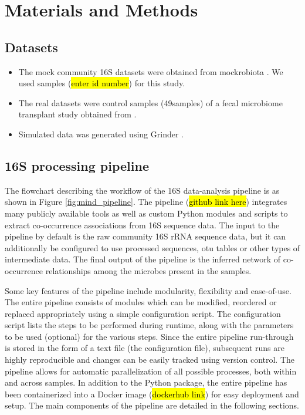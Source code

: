 
\section*{Materials and Methods}

  \subsection*{Datasets}

    \vspace{-5mm}
    \begin{itemize}
      \item The mock community 16S datasets were obtained from mockrobiota \cite{Bokulich2016}. We used samples (\hl{enter id number}) for this study.
      \item The real datasets were control samples (49samples)  of a fecal microbiome transplant study obtained from \cite{Kang2017}.
      \item Simulated data was generated using Grinder \cite{Angly2012}.
    \end{itemize}


  \subsection*{16S processing pipeline}

    \vspace{-5mm}

    The flowchart describing the workflow of the 16S data-analysis pipeline is as shown in Figure \ref{fig:mind_pipeline}.
    The pipeline (\hl{github link here}) integrates many publicly available tools as well as custom Python modules and scripts to extract co-occurrence associations from 16S sequence data.
    The input to the pipeline by default is the raw community 16S rRNA sequence data, but it can additionally be configured to use processed sequences, \ac{otu} tables or other types of intermediate data.
    The final output of the pipeline is the inferred network of co-occurrence relationships among the microbes present in the samples.

    Some key features of the pipeline include modularity, flexibility and ease-of-use.
    The entire pipeline consists of modules which can be modified, reordered or replaced appropriately using a simple configuration script.
    The configuration script lists the steps to be performed during runtime, along with the parameters to be used (optional) for the various steps.
    Since the entire pipeline run-through is stored in the form of a text file (the configuration file), subsequent runs are highly reproducible and changes can be easily tracked using version control.
    The pipeline allows for automatic parallelization of all possible processes, both within and across samples.
    In addition to the Python package, the entire pipeline has been containerized into a Docker \cite{Merkel1994} image (\hl{dockerhub link}) for easy deployment and setup.
    The main components of the pipeline are detailed in the following sections.

